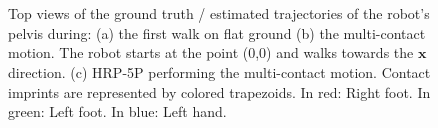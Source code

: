 \documentclass{IJCAS}
\begin{document}
\begin{figure}[!ht]
    \centering
    \\[-1ex]
    \\[-1ex]
    \caption{Top views of the ground truth / estimated trajectories of the robot's pelvis during: (a) the first walk on flat ground (b) the multi-contact motion. The robot starts at the point (0,0) and walks towards the $\boldsymbol{x}$ direction. (c) HRP-5P performing the multi-contact motion. Contact imprints are represented by colored trapezoids. In red: Right foot. In green: Left foot. In blue: Left hand.  }
    \label{fig:flat-odom-rphs1}
\end{figure}
\end{document}

